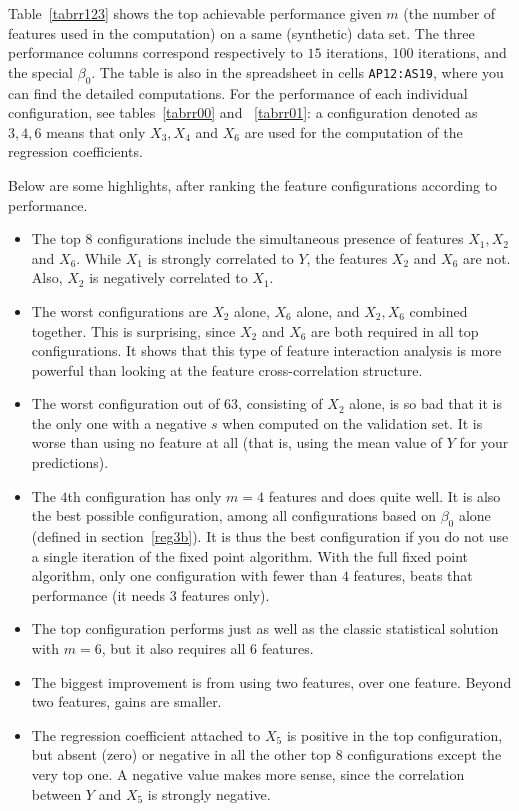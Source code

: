 \documentclass[oneside,10pt]{book}
\begin{document}
Table~\ref{tabrr123} shows the top achievable performance given $m$ (the number of features used in the computation) on a same (synthetic) data set. The three performance columns correspond respectively to $15$ iterations, $100$ iterations, and the special $\beta_0$.  The table is also in the spreadsheet in cells \texttt{AP12:AS19}, where you can find the detailed computations. For the performance of each individual configuration, see tables~\ref{tabrr00} and ~\ref{tabrr01}: a configuration denoted as $3,4,6$ means that only $X_3, X_4$ and $X_6$ are used for the computation of the regression coefficients.


\noindent Below are some highlights, after ranking the feature configurations according to performance.  
\begin{itemize}
\item The top $8$ configurations include the simultaneous presence of features $X_1,X_2$ and $X_6$. While $X_1$ is strongly correlated to $Y$, the features $X_2$ and $X_6$ are not. Also, $X_2$ is negatively correlated to $X_1$.
\item The worst configurations are $X_2$ alone, $X_6$ alone, and $X_2, X_6$ combined together. This is surprising, since $X_2$ and $X_6$ are both required in all top configurations. It shows that this type of feature interaction analysis is more powerful than looking at the feature cross-correlation structure. 
\item The worst configuration out of $63$, consisting of $X_2$ alone, is so bad that it is the only one with a negative $s$ when computed on the validation set. It is worse than using no feature at all (that is, using the mean value of $Y$ for your predictions).
\item The $4$th configuration has only $m=4$ features and does quite well. It is also the best possible configuration, among all configurations 
based on $\beta_0$ alone (defined in section~\ref{reg3b}). It is thus the best configuration if you do not use a single iteration of the fixed point algorithm. With the full fixed point algorithm, only one configuration with fewer than $4$ features, beats that performance (it needs $3$ features only).  
\item The top configuration performs just as well as the classic statistical solution with $m=6$, but it also requires all $6$ features. 
\item The biggest improvement is from using two features, over one feature. Beyond two features, gains are smaller. 
\item The regression coefficient attached to $X_5$ is positive in the top configuration, but absent (zero) or negative in all the other top 8 configurations except the very top one. A negative value makes more sense, since the correlation between $Y$ and $X_5$ is strongly negative.

\end{itemize}
\end{document}
